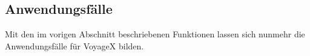 \newpage
\subsection{Anwendungsfälle}\label{4_UC}
Mit den im vorigen Abschnitt beschriebenen Funktionen lassen sich nunmehr die Anwendungsfälle für VoyageX bilden.


